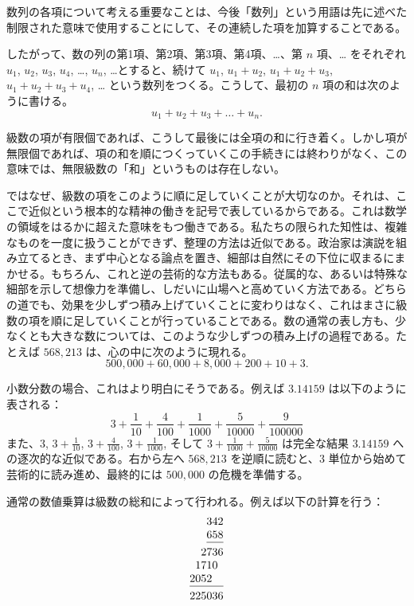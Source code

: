 \documentclass[a4paper,11pt,openany]{ltjsbook}
\providecommand{\Strut}[1][12pt]{\rule{0pt}{#1}}
\begin{document}
数列の各項について考える重要なことは、今後「数列」という用語は先に述べた制限された意味で使用することにして、その連続した項を加算することである。

したがって、数の列の第1項、第2項、第3項、第4項、…、第 $n$ 項、… をそれぞれ $u_{1}$, $u_{2}$, $u_{3}$, $u_{4}$, \dots, $u_{n}$, \dots とすると、続けて $u_{1}$, $u_{1} + u_{2}$, $u_{1} + u_{2} + u_{3}$, $u_{1} + u_{2} + u_{3} + u_{4}$, … という数列をつくる。こうして、最初の $n$ 項の和は次のように書ける。
\[
u_{1} + u_{2} + u_{3} + \dots + u_{n}.
\]

級数の項が有限個であれば、こうして最後には全項の和に行き着く。しかし項が無限個であれば、項の和を順につくっていくこの手続きには終わりがなく、この意味では、無限級数の「和」というものは存在しない。

ではなぜ、級数の項をこのように順に足していくことが大切なのか。それは、ここで近似という根本的な精神の働きを記号で表しているからである。これは数学の領域をはるかに超えた意味をもつ働きである。私たちの限られた知性は、複雑なものを一度に扱うことができず、整理の方法は近似である。政治家は演説を組み立てるとき、まず中心となる論点を置き、細部は自然にその下位に収まるにまかせる。もちろん、これと逆の芸術的な方法もある。従属的な、あるいは特殊な細部を示して想像力を準備し、しだいに山場へと高めていく方法である。どちらの道でも、効果を少しずつ積み上げていくことに変わりはなく、これはまさに級数の項を順に足していくことが行っていることである。数の通常の表し方も、少なくとも大きな数については、このような少しずつの積み上げの過程である。たとえば $568{,}213$ は、心の中に次のように現れる。
\[
500,000 + 60,000 + 8,000 + 200 + 10 + 3.
\]

小数分数の場合、これはより明白にそうである。例えば $3.14159$ は以下のように表される：
\[
3 + \frac{1}{10} + \frac{4}{100} + \frac{1}{1000} + \frac{5}{10000} + \frac{9}{100000}
\]
また、$3$, $3 + \frac{1}{10}$, $3 + \frac{4}{100}$, $3 + \frac{1}{1000}$, そして $3 + \frac{1}{1000} + \frac{5}{10000}$ は完全な結果 $3.14159$ への逐次的な近似である。右から左へ $568,213$ を逆順に読むと、$3$ 単位から始めて芸術的に読み進め、最終的には $500,000$ の危機を準備する。

通常の数値乗算は級数の総和によって行われる。例えば以下の計算を行う：
\[
\begin{array}{*{6}{@{}c@{}}}
 & & &3&4&2 \\
 & & &6&5&8 \\
\cline{4-6}
\Strut
 & &2&7&3&6 \\
 &1&7&1&0&  \\
2&0&5&2& &  \\
\cline{1-6}
\Strut
2&2&5&0&3&6
\end{array}
\]
\end{document}
